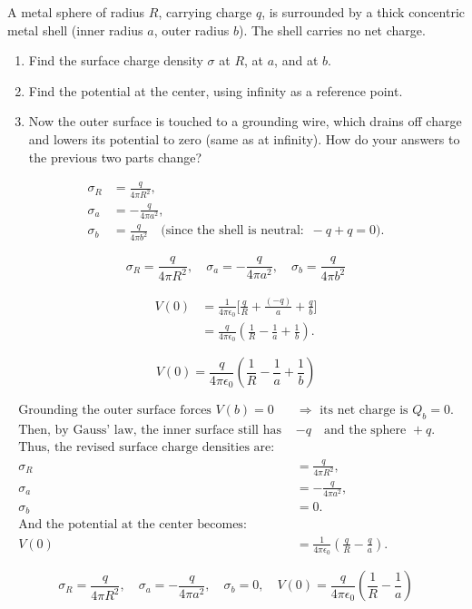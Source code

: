 \begin{hwkProblem}{2.38}{}

	A metal sphere of radius \( R \), carrying charge \( q \), is surrounded by a thick concentric metal shell (inner radius \( a \), outer radius \( b \)). The shell carries no net charge.
	\begin{enumerate}
		\item Find the surface charge density \( \sigma \) at \( R \), at \( a \), and at \( b \).
		\item Find the potential at the center, using infinity as a reference point.
		\item Now the outer surface is touched to a grounding wire, which drains off charge and lowers its potential to zero (same as at infinity). How do your answers to the previous two parts change?
	\end{enumerate}

	\hwkSol

	\hwkPart

	\begin{align*}
		\sigma_R &= \frac{q}{4\pi R^2},\\[1mm]
		\sigma_a &= -\frac{q}{4\pi a^2},\\[1mm]
		\sigma_b &= \frac{q}{4\pi b^2} \quad \text{(since the shell is neutral: } \, -q + q = 0\text{)}.
	\end{align*}

	\[
		\boxed{
			\sigma_R=\dfrac{q}{4\pi R^2},\quad \sigma_a=-\dfrac{q}{4\pi a^2},\quad \sigma_b=\dfrac{q}{4\pi b^2}
		}
	\]

	\hwkPart

	\begin{align*}
		V(0) &= \frac{1}{4\pi\epsilon_0}\Biggl[
			\frac{q}{R} + \frac{(-q)}{a} + \frac{q}{b}
		\Biggr] \\
		     &= \frac{q}{4\pi\epsilon_0}\left(\frac{1}{R} - \frac{1}{a} + \frac{1}{b}\right).
		\end{align*}

	\[
		\boxed{
			V(0)=\dfrac{q}{4\pi\epsilon_0}\left(\dfrac{1}{R}-\dfrac{1}{a}+\dfrac{1}{b}\right)
		}
	\]

	\hwkPart

	\begin{align*}
		\text{Grounding the outer surface forces } V(b)=0 &\Longrightarrow \text{ its net charge is } Q_b=0.\\[1mm]
		\text{Then, by Gauss' law, the inner surface still has } &-q \quad \text{and the sphere } +q.\\[1mm]
		\text{Thus, the revised surface charge densities are:}\\[1mm]
		\sigma_R &= \frac{q}{4\pi R^2},\\[1mm]
		\sigma_a &= -\frac{q}{4\pi a^2},\\[1mm]
		\sigma_b &= 0.\\[2mm]
		\text{And the potential at the center becomes:}\\[1mm]
		V(0) &= \frac{1}{4\pi\epsilon_0}\left(\frac{q}{R} - \frac{q}{a}\right).
	\end{align*}

	\[
		\boxed{
			\sigma_R=\dfrac{q}{4\pi R^2},\quad \sigma_a=-\dfrac{q}{4\pi a^2},\quad \sigma_b=0,\quad V(0)=\dfrac{q}{4\pi\epsilon_0}\left(\dfrac{1}{R}-\dfrac{1}{a}\right)
		}
	\]

\end{hwkProblem}

